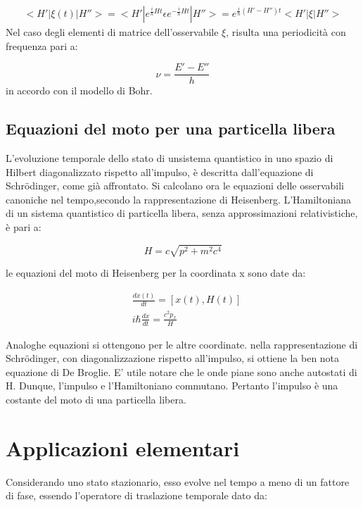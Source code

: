 \documentclass{article}
\begin{document}
\begin{equation}
    \begin{aligned}
        <H'|\xi(t)|H''>=<H'|e^{\frac{i}{\hbar}Ht}\epsilon e^{-\frac{i}{\hbar}Ht}|H''>=e^{\frac{i}{\hbar}(H'-H'')t}<H'|\xi|H''>
    \end{aligned}
\end{equation}
Nel caso degli elementi di matrice dell'osservabile $\xi$, risulta una periodicità con frequenza pari a:

\begin{equation}
    \nu= \frac{E'-E''}{h}
\end{equation}
in accordo con il modello di Bohr.

\subsection{Equazioni del moto per una particella libera}
L'evoluzione temporale dello stato di unsistema quantistico in uno spazio di Hilbert diagonalizzato rispetto all'impulso,
è descritta dall'equazione di Schrödinger, come già affrontato.
Si calcolano ora le equazioni delle osservabili canoniche nel tempo,secondo la rappresentazione di Heisenberg.
L'Hamiltoniana di un sistema quantistico di particella libera, senza approssimazioni relativistiche, è pari a:

\begin{equation}
    H=c\sqrt{p^2+m^2c^4}
\end{equation}

le equazioni del moto di Heisenberg per la coordinata x sono date da:

\begin{equation}
    \begin{aligned}
         & \frac{dx(t)}{dt}= [x(t),H(t)]          \\
         & i\hbar \frac{dx}{dt}= \frac{c^2p_x}{H}
    \end{aligned}
\end{equation}

Analoghe equazioni si ottengono per le altre coordinate.
nella rappresentazione di Schrödinger, con diagonalizzazione rispetto all'impulso, si ottiene la ben nota equazione di De Broglie.
E' utile notare che le onde piane sono anche autostati di H. Dunque, l'impulso e l'Hamiltoniano commutano. Pertanto l'impulso è una costante del moto di una particella libera.

\section{Applicazioni elementari}
Considerando uno stato stazionario, esso evolve nel tempo a meno di un fattore di fase, essendo l'operatore di traslazione temporale dato da:
\end{document}
